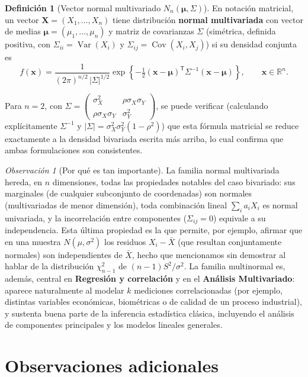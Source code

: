\documentclass[11pt,a4paper]{article}
\theoremstyle{plain}
\theoremstyle{definition}
\newtheorem{definicion}[teorema]{Definición}
\theoremstyle{remark}
\newtheorem{observacion}[teorema]{Observación}
\begin{document}
\begin{definicion}[Vector normal multivariado $N_n(\boldsymbol\mu,\Sigma)$]
En notación matricial, un vector $\mathbf X=(X_1,\dots,X_n)$ tiene distribución \textbf{normal multivariada} con vector de medias $\boldsymbol\mu=(\mu_1,\dots,\mu_n)$ y matriz de covarianzas $\Sigma$ (simétrica, definida positiva, con $\Sigma_{ii}=\operatorname{Var}(X_i)$ y $\Sigma_{ij}=\operatorname{Cov}(X_i,X_j)$) si su densidad conjunta es
\[
f(\mathbf x) = \frac{1}{(2\pi)^{n/2}\,|\Sigma|^{1/2}}\exp\left\{-\tfrac12(\mathbf x-\boldsymbol\mu)^{\mathsf T}\Sigma^{-1}(\mathbf x-\boldsymbol\mu)\right\}, \qquad \mathbf x\in\mathbb R^n.
\]
\end{definicion}

Para $n=2$, con $\Sigma = \begin{pmatrix}\sigma_X^2 & \rho\sigma_X\sigma_Y\\ \rho\sigma_X\sigma_Y & \sigma_Y^2\end{pmatrix}$, se puede verificar (calculando explícitamente $\Sigma^{-1}$ y $|\Sigma|=\sigma_X^2\sigma_Y^2(1-\rho^2)$) que esta fórmula matricial se reduce exactamente a la densidad bivariada escrita más arriba, lo cual confirma que ambas formulaciones son consistentes.

\begin{observacion}[Por qué es tan importante]
La familia normal multivariada hereda, en $n$ dimensiones, todas las propiedades notables del caso bivariado: sus marginales (de cualquier subconjunto de coordenadas) son normales (multivariadas de menor dimensión), toda combinación lineal $\sum_i a_iX_i$ es normal univariada, y la incorrelación entre componentes ($\Sigma_{ij}=0$) equivale a su independencia. Esta última propiedad es la que permite, por ejemplo, afirmar que en una muestra $N(\mu,\sigma^2)$ los residuos $X_i-\bar X$ (que resultan conjuntamente normales) son independientes de $\bar X$, hecho que mencionamos sin demostrar al hablar de la distribución $\chi_{n-1}^2$ de $(n-1)S^2/\sigma^2$. La familia multinormal es, además, central en \textbf{Regresión y correlación} y en el \textbf{Análisis Multivariado}: aparece naturalmente al modelar $k$ mediciones correlacionadas (por ejemplo, distintas variables económicas, biométricas o de calidad de un proceso industrial), y sustenta buena parte de la inferencia estadística clásica, incluyendo el análisis de componentes principales y los modelos lineales generales.
\end{observacion}

\section{Observaciones adicionales}
\end{document}
